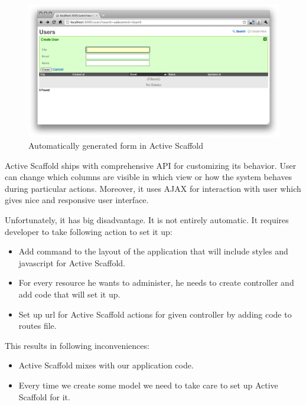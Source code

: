     	\begin{figure}[hbt!]
    		\begin{center}
    			\includegraphics[width=\linewidth]{images/chapter01/activescaffold2.png}
    			\caption{Automatically generated form in Active Scaffold}
    			\label{activescaffold2}
    		\end{center}
    	\end{figure}
      
    Active Scaffold ships with comprehensive API for customizing its behavior. User can change which columns are visible in which view or how the system behaves during particular actions. Moreover, it uses  \ac{AJAX} for interaction with user which gives nice and responsive user interface.
    
    Unfortunately, it has big disadvantage. It is not entirely automatic. It requires developer to take following action to set it up:
    
    \begin{itemize}
      \item Add command to the layout of the application that will include styles and javascript for Active Scaffold.
      \item For every resource he wants to administer, he needs to create controller and add code that will set it up.
      \item Set up url for Active Scaffold actions for given controller by adding code to routes file.
    \end{itemize}

    This results in following inconveniences:
    
    \begin{itemize}
      \item Active Scaffold mixes with our application code.
      \item Every time we create some model we need to take care to set up Active Scaffold for it.
    \end{itemize}
    

